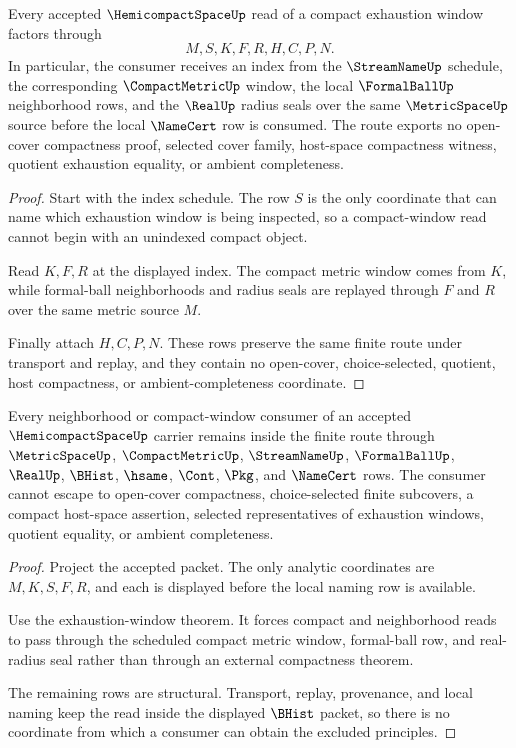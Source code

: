 \begin{theorem}
\label{thm:hemicompact-space-exhaustion-window}
Every accepted $\HemicompactSpaceUp$ read of a compact exhaustion window factors through
$$
M,S,K,F,R,H,C,P,N .
$$
In particular, the consumer receives an index from the $\StreamNameUp$ schedule, the corresponding $\CompactMetricUp$ window, the local $\FormalBallUp$ neighborhood rows, and the $\RealUp$ radius seals over the same $\MetricSpaceUp$ source before the local $\NameCert$ row is consumed. The route exports no open-cover compactness proof, selected cover family, host-space compactness witness, quotient exhaustion equality, or ambient completeness.
\end{theorem}
\begin{proof}
Start with the index schedule. The row $S$ is the only coordinate that can name which exhaustion window is being inspected, so a compact-window read cannot begin with an unindexed compact object.

Read $K,F,R$ at the displayed index. The compact metric window comes from $K$, while formal-ball neighborhoods and radius seals are replayed through $F$ and $R$ over the same metric source $M$.

Finally attach $H,C,P,N$. These rows preserve the same finite route under transport and replay, and they contain no open-cover, choice-selected, quotient, host compactness, or ambient-completeness coordinate.
\end{proof}

\begin{theorem}
\label{thm:hemicompact-space-nonescape}
Every neighborhood or compact-window consumer of an accepted $\HemicompactSpaceUp$ carrier remains inside the finite route through $\MetricSpaceUp$, $\CompactMetricUp$, $\StreamNameUp$, $\FormalBallUp$, $\RealUp$, $\BHist$, $\hsame$, $\Cont$, $\Pkg$, and $\NameCert$ rows. The consumer cannot escape to open-cover compactness, choice-selected finite subcovers, a compact host-space assertion, selected representatives of exhaustion windows, quotient equality, or ambient completeness.
\end{theorem}
\begin{proof}
Project the accepted packet. The only analytic coordinates are $M,K,S,F,R$, and each is displayed before the local naming row is available.

Use the exhaustion-window theorem. It forces compact and neighborhood reads to pass through the scheduled compact metric window, formal-ball row, and real-radius seal rather than through an external compactness theorem.

The remaining rows are structural. Transport, replay, provenance, and local naming keep the read inside the displayed $\BHist$ packet, so there is no coordinate from which a consumer can obtain the excluded principles.
\end{proof}


